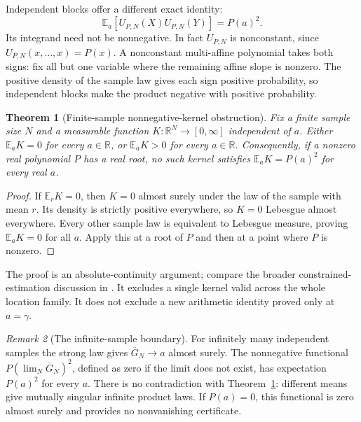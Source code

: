 \documentclass[11pt,a4paper]{article}
\newcommand{\R}{\mathbb R}
\newcommand{\E}{\mathbb E}
\newtheorem{theorem}{Theorem}[section]
\theoremstyle{definition}
\theoremstyle{remark}
\newtheorem{remark}[theorem]{Remark}
\numberwithin{equation}{section}
\begin{document}
Independent blocks offer a different exact identity:
\begin{equation}
 \E_a[U_{P,N}(X)U_{P,N}(Y)]=P(a)^2.
 \label{at:eq:independent-product}
\end{equation}
Its integrand need not be nonnegative. In fact $U_{P,N}$ is
nonconstant, since $U_{P,N}(x,\ldots,x)=P(x)$. A nonconstant
multi-affine polynomial takes both signs: fix all but one variable
where the remaining affine slope is nonzero. The positive density of
the sample law gives each sign positive probability, so independent
blocks make the product negative with positive probability.

\begin{theorem}[Finite-sample nonnegative-kernel obstruction]
\label{at:sta:positive}
Fix a finite sample size $N$ and a measurable function
$K:\R^N\to[0,\infty]$ independent of $a$. Either $\E_aK=0$ for every
$a\in\R$, or $\E_aK>0$ for every $a\in\R$. Consequently, if a
nonzero real polynomial $P$ has a real root, no such kernel satisfies
$\E_aK=P(a)^2$ for every real $a$.
\end{theorem}
\begin{proof}
If $\E_rK=0$, then $K=0$ almost surely under the law of the sample
with mean $r$. Its density is strictly positive everywhere, so $K=0$
Lebesgue almost everywhere. Every other sample law is equivalent to
Lebesgue measure, proving $\E_aK=0$ for all $a$. Apply this at a root
of $P$ and then at a point where $P$ is nonzero.
\end{proof}
The proof is an absolute-continuity argument; compare the broader
constrained-estimation discussion in \cite{at:Somekh2016}. It excludes a
single kernel valid across the whole location family. It does not
exclude a new arithmetic identity proved only at $a=\gamma$.

\begin{remark}[The infinite-sample boundary]
For infinitely many independent samples the strong law gives
$\overline G_N\to a$ almost surely. The nonnegative functional
$P(\lim_N\overline G_N)^2$, defined as zero if the limit does not exist,
has expectation $P(a)^2$ for every $a$. There is no contradiction with
Theorem~\ref{at:sta:positive}: different means give mutually singular
infinite product laws. If $P(a)=0$, this functional is zero almost
surely and provides no nonvanishing certificate.
\end{remark}
\end{document}
